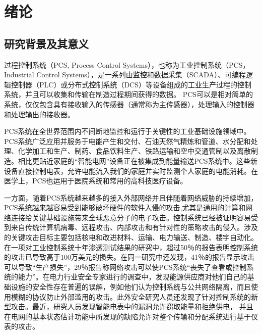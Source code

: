 

\chapter{绪论}
\label{chap:intro}

\section{研究背景及其意义}

过程控制系统（PCS, Process Control Systems），也称为工业控制系统（PCS，Industrial Control Systems），是一系列由监控和数据采集（SCADA）、可编程逻辑控制器（PLC）或分布式控制系统（DCS）等设备组成的工业生产过程的控制系统，并且可以收集和传输在制造过程期间获得的数据。 PCS可以是相对简单的系统，仅仅包含具有接收输入的传感器（通常称为主传感器），处理输入的控制器和处理输出的接收器。

PCS系统在全世界范围内不间断地监控和运行于关键性的工业基础设施领域中。PCS系统广泛应用并服务于电能产生和交付、石油天然气精炼和管道、水分配和处理、化学加工和生产、制药、食品饮料生产、铁路运输和空中交通管制以及离散制造\parencite{Stouffer11,Weiss10,Hentea08}。相比更贴近家庭的“智能电网”设备正在被集成到能量输送PCS系统中。这些新设备直接控制电表，允许电能流入我们的家庭并实时监测个人家庭的电能消耗。在医学上，PCS也运用于医院系统和常用的高科技医疗设备。

一方面，随着PCS系统越来越多的接入外部网络并且伴随着网络威胁的持续增加，PCS系统越来越容易受到能够破坏硬件的软件入侵的攻击,尤其是通用的计算和网络连接给关键基础设施带来全球恶意分子的电子攻击。控制系统已经被证明容易受到来自传统计算机病毒\parencite{Roberts08,Krebs08}、远程攻击\parencite{Grad10}、内部攻击\parencite{Leall09}和有针对性的策略攻击\parencite{Zetter10}的侵入。涉及的关键攻击目标主要包括核电和改进材料\parencite{Krebs08,Leyden08}、运输\parencite{Grad10}、电力输送\parencite{Meserve07}、制造\parencite{Roberts08}、楼宇自动化\parencite{Leall09}。
在一项对工业控制系统十年渗透测试结果的研究中，超过50％的报告表明控制系统的攻击已导致高于100万美元的损失\parencite{Byres03}。在同一研究中还发现，41％的报告显示攻击可以导致“生产损失”，29％报告称网络攻击可以使PCS系统“丧失了查看或控制系统的能力”。在电力行业安全专家进行的调查中，发现能源供应商对他们自己的基础设施的安全性存在普遍的误解，例如他们认为控制系统与公共网络隔离，而且使用模糊的协议防止外部滥用的攻击\parencite{1Pietre11}。此外安全研究人员还发现了针对控制系统的新型攻击。最近，研究人员发现智能电表中的漏洞允许窃取能量和拒绝供电\parencite{1McLaughlin09,1McLaughlin10}， 并且在电网的基本状态估计功能中所发现的缺陷允许对整个传输和分配系统进行基于仪表的攻击\parencite{1Liu09}。

